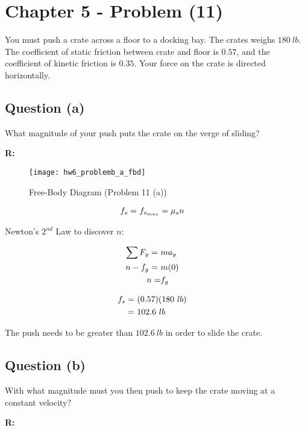\section{Chapter 5 - Problem (11)}
	You must push a crate across a floor to a docking bay. The crates weighs $180 \ lb$. The coefficient of static friction between crate and floor is $0.57$, and the coefficient of kinetic friction is $0.35$. Your force on the crate is directed horizontally.

	\subsection{Question (a)}
		What magnitude of your push puts the crate on the verge of sliding?

		\textbf{R:} \newline

		\begin{figure}[H]
			\begin{center}
				\texttt{[image: hw6\_problemb\_a\_fbd]}
				\caption{Free-Body Diagram (Problem 11 (a))}
				\label{fig:hw6_problemb_a_fbd}
			\end{center}
		\end{figure}

		\begin{align}
			f_{s} = \ &f_{s_{max}} = \mu_{s}n& \notag
		\end{align}

		Newton's $2^{nd}$ Law to discover $n$:

		\begin{align}
			\sum F_{y} = \ &ma_{y}& \notag \\
			n - f_{g} = \ &m(0)& \notag \\
			n = &f_{g}& \notag
		\end{align}

		\begin{align}
			f_{s} = \ &(0.57)(180 \ lb)& \notag \\
			= \ &102.6 \ lb&
		\end{align}

		The push needs to be greater than $102.6 \ lb$ in order to slide the crate.

	\subsection{Question (b)}
		With what magnitude must you then push to keep the crate moving at a constant velocity?

		\textbf{R:} \newline

